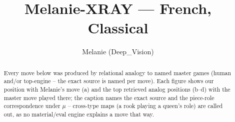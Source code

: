 \documentclass[11pt]{article}
\title{Melanie-XRAY — French, Classical}
\author{Melanie (Deep\_Vision)}
\date{}
\begin{document}
\maketitle

\begin{abstract}Every move below was produced by relational analogy to named master games (human and/or top-engine -- the exact source is named per move). Each figure shows our position with Melanie's move (a) and the top retrieved analog positions (b--d) with the master move played there; the caption names the exact source and the piece-role correspondence under $\mu$ -- cross-type maps (a rook playing a queen's role) are called out, as no material/eval engine explains a move that way.\end{abstract}

\begin{figure}[p]\centering
\begin{subfigure}{0.46\textwidth}\centering
\resizebox{\linewidth}{!}{%
\newchessgame
\chessboard[
  setfen={rnb1k2r/pppnqppp/4p3/3pP3/3P4/2N5/PPP2PPP/R2QKBNR w KQkq - 0 7},
  showmover=false,
  pgfstyle=straightmove, color=movearrow, markmove={f2-f4}
]}
\caption{}
\end{subfigure}\hfill
\begin{subfigure}{0.46\textwidth}\centering
\resizebox{\linewidth}{!}{%
\newchessgame
\chessboard[
  setfen={rnb1k2r/pppnqppp/4p3/3pP3/3P4/2N5/PPP2PPP/R2QKBNR w KQkq - 0 7},
  showmover=false,
  pgfstyle=straightmove, color=movearrow, markmove={f2-f4}
]}
\caption{}
\end{subfigure}
\\[4pt]
\begin{subfigure}{0.46\textwidth}\centering
\resizebox{\linewidth}{!}{%
\newchessgame
\chessboard[
  setfen={rnb1k2r/pppnqppp/4p3/3pP3/3P4/2N5/PPP2PPP/R2QKBNR w KQkq - 0 7},
  showmover=false,
  pgfstyle=straightmove, color=movearrow, markmove={f2-f4}
]}
\caption{}
\end{subfigure}\hfill
\begin{subfigure}{0.46\textwidth}\centering
\resizebox{\linewidth}{!}{%
\newchessgame
\chessboard[
  setfen={rnb1k2r/pppnqppp/4p3/3pP3/3P4/2N5/PPP2PPP/R2QKBNR w KQkq - 0 7},
  showmover=false,
  pgfstyle=straightmove, color=movearrow, markmove={f2-f4}
]}
\caption{}
\end{subfigure}

\end{figure}
\end{document}

